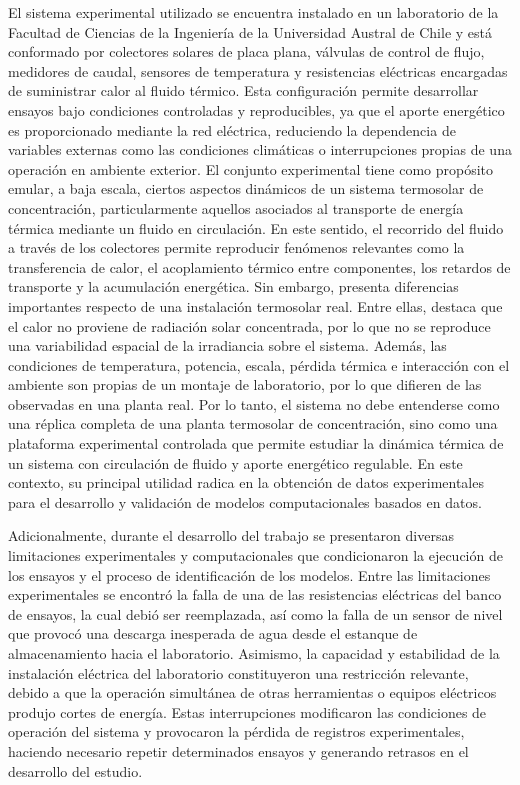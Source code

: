 \documentclass[11pt]{report}
\begin{document}
El sistema experimental utilizado se encuentra instalado en un laboratorio de la Facultad de Ciencias de la Ingeniería de la Universidad Austral de Chile y está conformado por colectores solares de placa plana, válvulas de control de flujo, medidores de caudal, sensores de temperatura y resistencias eléctricas encargadas de suministrar calor al fluido térmico. Esta configuración permite desarrollar ensayos bajo condiciones controladas y reproducibles, ya que el aporte energético es proporcionado mediante la red eléctrica, reduciendo la dependencia de variables externas como las condiciones climáticas o interrupciones propias de una operación en ambiente exterior.
El conjunto experimental tiene como propósito emular, a baja escala, ciertos aspectos dinámicos de un sistema termosolar de concentración, particularmente aquellos asociados al transporte de energía térmica mediante un fluido en circulación. En este sentido, el recorrido del fluido a través de los colectores permite reproducir fenómenos relevantes como la transferencia de calor, el acoplamiento térmico entre componentes, los retardos de transporte y la acumulación energética.
Sin embargo, presenta diferencias importantes respecto de una instalación termosolar real. Entre ellas, destaca que el calor no proviene de radiación solar concentrada, por lo que no se reproduce una variabilidad espacial de la irradiancia sobre el sistema. Además, las condiciones de temperatura, potencia, escala, pérdida térmica e interacción con el ambiente son propias de un montaje de laboratorio, por lo que difieren de las observadas en una planta real.
Por lo tanto, el sistema no debe entenderse como una réplica completa de una planta termosolar de concentración, sino como una plataforma experimental controlada que permite estudiar la dinámica térmica de un sistema con circulación de fluido y aporte energético regulable. En este contexto, su principal utilidad radica en la obtención de datos experimentales para el desarrollo y validación de modelos computacionales basados en datos.

Adicionalmente, durante el desarrollo del trabajo se presentaron diversas limitaciones experimentales y computacionales que condicionaron la ejecución de los ensayos y el proceso de identificación de los modelos. Entre las limitaciones experimentales se encontró la falla de una de las resistencias eléctricas del banco de ensayos, la cual debió ser reemplazada, así como la falla de un sensor de nivel que provocó una descarga inesperada de agua desde el estanque de almacenamiento hacia el laboratorio. Asimismo, la capacidad y estabilidad de la instalación eléctrica del laboratorio constituyeron una restricción relevante, debido a que la operación simultánea de otras herramientas o equipos eléctricos produjo cortes de energía. Estas interrupciones modificaron las condiciones de operación del sistema y provocaron la pérdida de registros experimentales, haciendo necesario repetir determinados ensayos y generando retrasos en el desarrollo del estudio.
\end{document}
